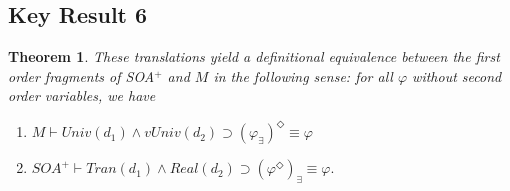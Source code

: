 \documentclass{article}
\newtheorem{theorem}{Theorem}
\begin{document}
\subsection{Key Result 6}
\begin{theorem}
    These translations yield a definitional equivalence 
    between the first order fragments of SOA$^+$ and $M$ in the following sense: for all 
    $\varphi$ without second order variables, we have
    \begin{enumerate}
        \item $M \vdash Univ(d_1) \wedge vUniv(d_2) \supset (\varphi_\exists)^\Diamond \equiv \varphi$
        \item $SOA^+ \vdash Tran(d_1) \wedge Real(d_2) \supset (\varphi^\Diamond)_\exists \equiv \varphi.$
    \end{enumerate}
    \end{theorem}
\end{document}
